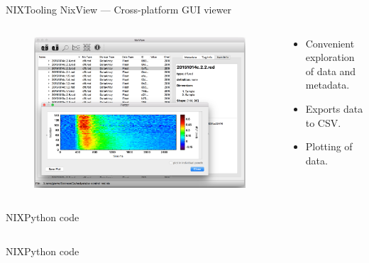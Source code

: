 \documentclass[10pt]{beamer}
\begin{document}
\begin{frame}{NIX}{Tooling}
    NixView --- Cross-platform GUI viewer

    \begin{columns}
        \begin{column}{0.5\textwidth}
            \begin{figure}
                \includegraphics[width=\textwidth]{nixview.pdf}
            \end{figure}
        \end{column}
        \begin{column}{0.5\textwidth}
            \begin{itemize}
                \item Convenient exploration of data and metadata.
                \item Exports data to CSV.\
                \item Plotting of data.
            \end{itemize}
        \end{column}
    \end{columns}
\end{frame}

\begin{frame}[fragile]{NIX}{Python code}
    \inputminted[fontsize=\footnotesize,lastline=15]{python}{./code/nixify-data.py}
\end{frame}

\begin{frame}[fragile]{NIX}{Python code}
    \inputminted[fontsize=\footnotesize,firstline=17]{python}{./code/nixify-data.py}
\end{frame}
\end{document}
